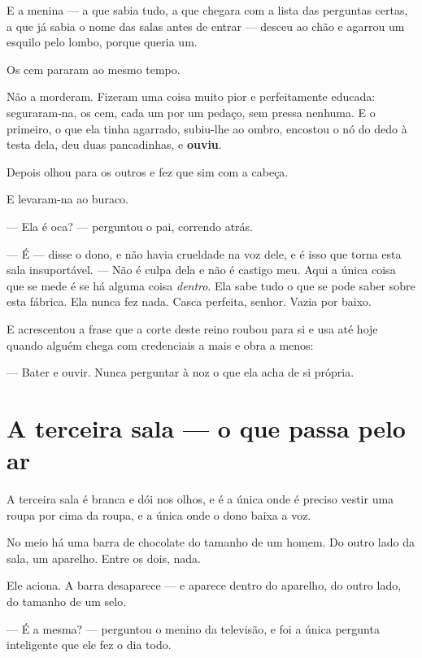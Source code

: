\documentclass[livro.tex]{subfiles}
\begin{document}
\medskip

E a menina --- a que sabia tudo, a que chegara com a lista das perguntas certas, a que já
sabia o nome das salas antes de entrar --- desceu ao chão e agarrou um esquilo pelo lombo,
porque queria um.

Os cem pararam ao mesmo tempo.

Não a morderam. Fizeram uma coisa muito pior e perfeitamente educada: seguraram-na, os
cem, cada um por um pedaço, sem pressa nenhuma. E o primeiro, o que ela tinha agarrado,
subiu-lhe ao ombro, encostou o nó do dedo à testa dela, deu duas pancadinhas, e
\textbf{ouviu}.

Depois olhou para os outros e fez que sim com a cabeça.

E levaram-na ao buraco.

\medskip

--- Ela é oca? --- perguntou o pai, correndo atrás.

--- É --- disse o dono, e não havia crueldade na voz dele, e é isso que torna esta sala
insuportável. --- Não é culpa dela e não é castigo meu. Aqui a única coisa que se mede é
se há alguma coisa \emph{dentro}. Ela sabe tudo o que se pode saber sobre esta fábrica.
Ela nunca fez nada. Casca perfeita, senhor. Vazia por baixo.

\medskip

E acrescentou a frase que a corte deste reino roubou para si e usa até hoje quando alguém
chega com credenciais a mais e obra a menos:

--- Bater e ouvir. Nunca perguntar à noz o que ela acha de si própria.

\chapter{A terceira sala --- o que passa pelo ar}

A terceira sala é branca e dói nos olhos, e é a única onde é preciso vestir uma roupa por
cima da roupa, e a única onde o dono baixa a voz.

No meio há uma barra de chocolate do tamanho de um homem. Do outro lado da sala, um
aparelho. Entre os dois, nada.

Ele aciona. A barra desaparece --- e aparece dentro do aparelho, do outro lado, do tamanho
de um selo.

\medskip

--- É a mesma? --- perguntou o menino da televisão, e foi a única pergunta inteligente que
ele fez o dia todo.
\end{document}
